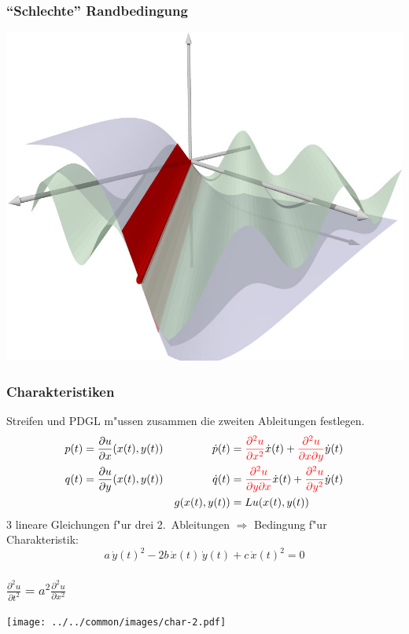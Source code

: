 \begin{frame}
\frametitle{``Schlechte'' Randbedingung}
\begin{center}
\includegraphics[width=\hsize]{../../common/3d/streifen1.jpg}
\end{center}
\end{frame}

\begin{frame}
\frametitle{Charakteristiken}

Streifen und PDGL m"ussen zusammen die zweiten Ableitungen festlegen.
\begin{align*}
p(t)&=\frac{\partial u}{\partial x}(x(t), y(t))
&
\dot p(t)
&={\color{red} \frac{\partial^2 u}{\partial x^2}}\dot x(t)
+
{\color{red}\frac{\partial^2u}{\partial x\partial y}}\dot y(t)
\\
q(t)&=\frac{\partial u}{\partial y}(x(t), y(t))
&
\dot q(t)
&=
{\color{red}\frac{\partial^2 u}{\partial y\partial x}}\dot x(t)
+
{\color{red}\frac{\partial^2u}{\partial y^2}}\dot y(t)
\\
&&g(x(t),y(t))&=Lu (x(t),y(t))
\end{align*}
3 lineare Gleichungen f"ur drei 2.~Ableitungen
$\Rightarrow$
Bedingung f"ur Charakteristik:
\[
a\,\dot y(t)^2-2b\,\dot x(t)\,\dot y(t)+c\,\dot x(t)^2=0
\]
\end{frame}

\begin{frame}
\frametitle{$\displaystyle \frac{\partial^2u}{\partial t^2}=a^2\frac{\partial^2u}{\partial x^2}$}
\pause
\begin{center}
\texttt{[image: ../../common/images/char-2.pdf]}
\end{center}
\end{frame}

